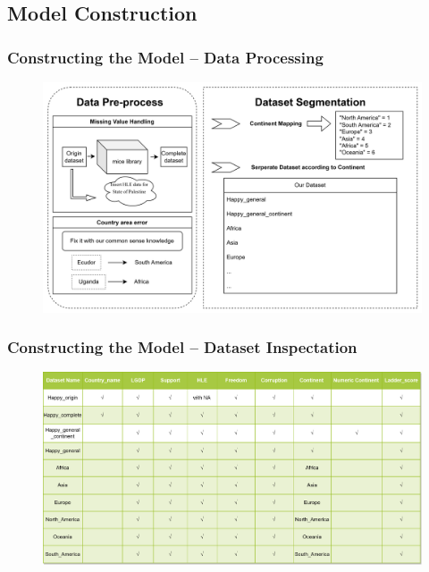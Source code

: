 \documentclass{beamer}
\begin{document}
\subsection{Model Construction}
% 
% 
% 
% 
\begin{frame}
  \frametitle{Constructing the Model -- Data Processing}
  \begin{figure}
    \includegraphics[width=\textwidth]{img/Data Process.png}
  \end{figure}
\end{frame}
% 
% 
% 
% 
\begin{frame}
  \frametitle{Constructing the Model -- Dataset Inspectation}
  \begin{figure}
    \includegraphics[width=\textwidth]{img/Dataset We have.png}
  \end{figure}
\end{frame}
% 
% 
% 
% 
% 
\end{document}

